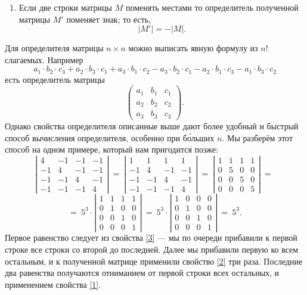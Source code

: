 \documentclass{article}
\begin{document}
\begin{enumerate}[resume]
 \item 
Если две строки матрицы $M$ поменять местами то определитель полученной матрицы $M'$ поменяет знак; то есть,
\[|M'|=-|M|.\]
\end{enumerate}


Для определителя матрицы $n\times n$ можно выписать явную формулу из $n!$ слагаемых. 
Например 
\[
a_1{\cdot} b_2{\cdot} c_3+a_2{\cdot} b_3{\cdot} c_1+a_3{\cdot} b_1{\cdot} c_2-a_3{\cdot} b_2{\cdot} c_1-a_2{\cdot} b_1{\cdot} c_3-a_1{\cdot} b_3{\cdot} c_2\]
есть определитель матрицы
\[\left(
\begin{matrix}
a_1&b_1&c_1
\\
a_2&b_2&c_2
\\
a_3&b_3&c_3
\end{matrix}
\right).\]
Однако свойства определителя описанные выше дают более удобный и быстрый способ вычисления определителя, особенно при б\'{о}льших $n$.
Мы разберём этот способ на одном примере, который нам пригодится позже:
\[\left|
\begin{matrix}
4&-1&-1&-1
\\
-1&4&-1&-1
\\
-1&-1&4&-1
\\
-1&-1&-1&4
\end{matrix}
\right|
\ 
=
\ 
\left|
\begin{matrix}
1&1&1&1
\\
-1&4&-1&-1
\\
-1&-1&4&-1
\\
-1&-1&-1&4
\end{matrix}
\right|
\ 
=
\ 
\left|
\begin{matrix}
1&1&1&1
\\
0&5&0&0
\\
0&0&5&0
\\
0&0&0&5
\end{matrix}
\right|
\ 
=
\ 
\]
\[
=\ 
5^3\cdot
\left|
\begin{matrix}
1&1&1&1
\\
0&1&0&0
\\
0&0&1&0
\\
0&0&0&1
\end{matrix}
\right|\ =\ 
5^3\cdot\left|
\begin{matrix}
1&0&0&0
\\
0&1&0&0
\\
0&0&1&0
\\
0&0&0&1
\end{matrix}
\right|
\ =\ 5^3.\]
Первое равенство следует из свойства \ref{3} --- мы по очереди прибавили к первой строке все строки со второй до последней. 
Далее мы прибавили первую ко всем остальным, и к полученной матрице применили свойство \ref{2} три раза.
Последние два равенства получаются отниманием от первой строки всех остальных, и применением свойства \ref{1}.
\end{document}
